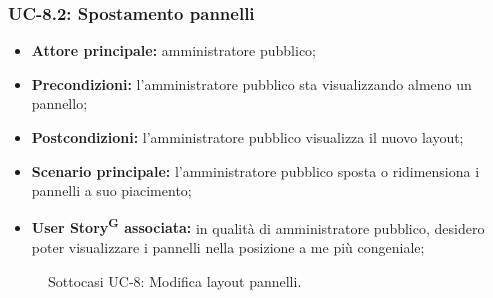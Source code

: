 \documentclass[8pt]{article}
\newcommand{\glossterm}[1]{#1\textsuperscript{G}} %
\begin{document}
\subsubsection*{UC-8.2: Spostamento pannelli}
\begin{itemize}
    \item \textbf{Attore principale:} amministratore pubblico;
    \item \textbf{Precondizioni:} l'amministratore pubblico sta visualizzando almeno un pannello;
    \item \textbf{Postcondizioni:} l’amministratore pubblico visualizza il nuovo layout;
    \item \textbf{Scenario principale: }l’amministratore pubblico sposta o ridimensiona i pannelli a
        suo piacimento;
    \item \textbf{\glossterm{User Story} associata:} in qualità di amministratore pubblico, desidero poter
        visualizzare i pannelli nella posizione a me più congeniale;
\end{itemize}
\begin{figure}[ht!]
    \centering
    \caption{Sottocasi UC-8: Modifica layout pannelli.}
    \label{fig:Sottocasi UC-8: Modifica layout pannelli}
\end{figure}
\end{document}

